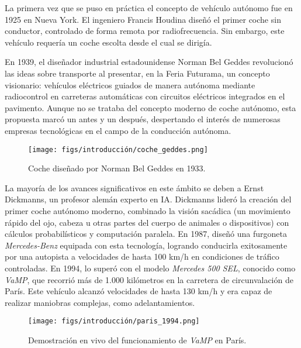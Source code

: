 La primera vez que se puso en práctica el concepto de vehículo autónomo fue en 1925 en Nueva York. El ingeniero Francis Houdina diseñó el primer coche sin conductor, controlado de forma remota por radiofrecuencia. Sin embargo, este vehículo requería un coche escolta desde el cual se dirigía.

En 1939, el diseñador industrial estadounidense Norman Bel Geddes revolucionó las ideas sobre transporte al presentar, en la Feria Futurama, un concepto visionario: vehículos eléctricos guiados de manera autónoma mediante radiocontrol en carreteras automáticas con circuitos eléctricos integrados en el pavimento. Aunque no se trataba del concepto moderno de coche autónomo, esta propuesta marcó un antes y un después, despertando el interés de numerosas empresas tecnológicas en el campo de la conducción autónoma.

\begin{figure} [ht]
  \begin{center}
    \texttt{[image: figs/introducción/coche\_geddes.png]}
  \end{center}
  \caption{Coche diseñado por Norman Bel Geddes en 1933.}
  \label{coche-geddes}
  \end{figure}

La mayoría de los avances significativos en este ámbito se deben a Ernst Dickmanns, un profesor alemán experto en \ac{IA}. Dickmanns lideró la creación del primer coche autónomo moderno, combinado la visión sacádica (un movimiento
rápido del ojo, cabeza u otras partes del cuerpo de animales o dispositivos) con cálculos probabilísticos y computación paralela. En 1987, diseñó una furgoneta \textit{Mercedes-Benz} equipada con esta tecnología, logrando conducirla exitosamente por una autopista a velocidades de hasta 100 km/h en condiciones de tráfico controladas. En 1994, lo superó con el modelo  \textit{Mercedes 500 SEL}, conocido como \textit{VaMP}, que recorrió más de 1.000 kilómetros en la carretera de circunvalación de París. Este vehículo alcanzó velocidades de hasta 130 km/h y era capaz de realizar maniobras complejas, como adelantamientos.

\begin{figure}[ht]
  \begin{center}
    \texttt{[image: figs/introducción/paris\_1994.png]}
  \end{center}
  \caption{Demostración en vivo del funcionamiento de \textit{VaMP} en París.}
  \label{coche-geddes}
\end{figure}

